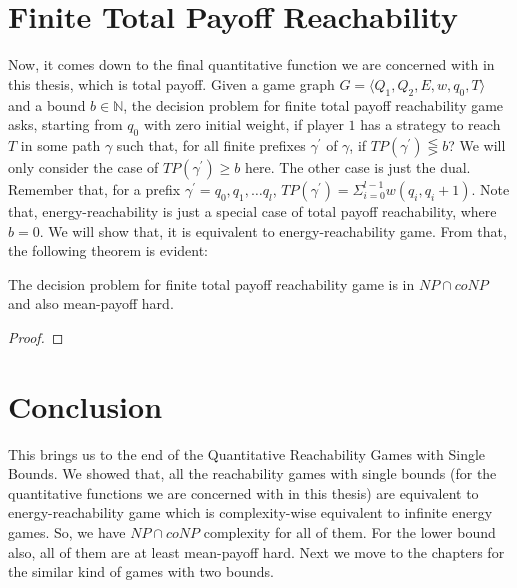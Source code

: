 \section{Finite Total Payoff Reachability}
Now, it comes down to the final quantitative function we are concerned with in this thesis, which is total payoff. Given a game graph $G=\langle Q_1, Q_2, E, w, q_0,T\rangle$ and a bound $b \in \mathbb{N}$, the decision problem for finite total payoff reachability game asks, starting from $q_0$ with zero initial weight, if player $1$ has a strategy to reach $T$ in some path $\gamma$ such that, for all finite prefixes $\gamma^{\prime}$ of $\gamma$, if $TP(\gamma^{\prime}) \lesseqgtr b$? We will only consider the case of  $TP(\gamma^{\prime}) \geq b$ here. The other case is just the dual. Remember that, for a prefix $\gamma^{\prime}= q_0,q_1,\ldots q_l$, $TP(\gamma^{\prime})= \Sigma_{i=0}^{l-1} w(q_i,q_i+1)$. Note that, energy-reachability is just a special case of total payoff reachability, where $b=0$. We will show that, it is equivalent to energy-reachability game. From that, the following theorem is evident:\\
\begin{theorem}
\label{fin-totalpayoff-thm}
The decision problem for finite total payoff reachability game is in $NP \cap coNP$ and also mean-payoff hard. 
\end{theorem}
\begin{proof}
\huge{}
\end{proof}

\section{Conclusion}
This brings us to the end of the Quantitative Reachability Games with Single Bounds. We showed that, all the reachability games with single bounds (for the quantitative functions we are concerned with in this thesis) are equivalent to energy-reachability game which is complexity-wise equivalent to infinite energy games. So, we have $NP \cap coNP$ complexity for all of them. For the lower bound also, all of them are at least mean-payoff hard. Next we move to the chapters for the similar kind of games with two bounds. 